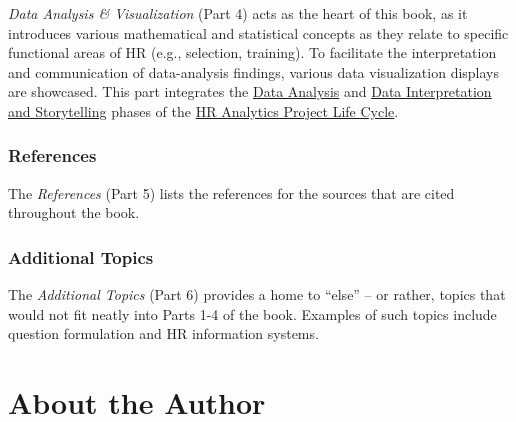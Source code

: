 \documentclass[]{book}
\begin{document}
\emph{Data Analysis \& Visualization} (Part 4) acts as the heart of this
book, as it introduces various mathematical and statistical concepts as
they relate to specific functional areas of HR (e.g., selection,
training). To facilitate the interpretation and communication of
data-analysis findings, various data visualization displays are
showcased. This part integrates the \protect\hyperlink{danalysis}{Data
Analysis} and \protect\hyperlink{dinterpret}{Data Interpretation and
Storytelling} phases of the \protect\hyperlink{hraplc}{HR Analytics
Project Life Cycle}.

\subsubsection{References}\label{ref}

The \emph{References} (Part 5) lists the references for the sources that
are cited throughout the book.

\subsubsection{Additional Topics}\label{addtopicspref}

The \emph{Additional Topics} (Part 6) provides a home to ``else'' -- or
rather, topics that would not fit neatly into Parts 1-4 of the book.
Examples of such topics include question formulation and HR information
systems.

\section{About the Author}\label{aboutauthor}
\end{document}
